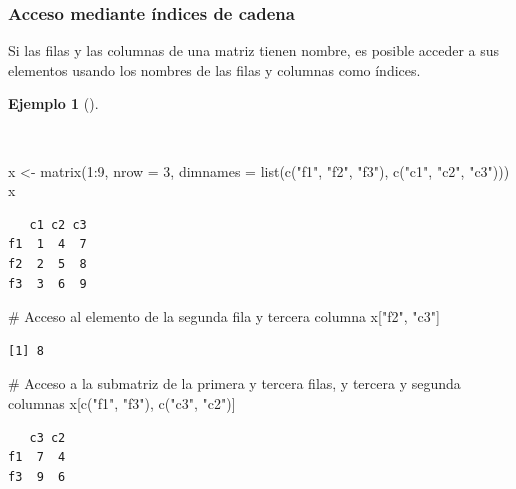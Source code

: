 \documentclass[
  a4paper,
]{scrreport}
\newenvironment{Shaded}{\begin{snugshade}}{\end{snugshade}}
\newcommand{\AttributeTok}[1]{\textcolor[rgb]{0.40,0.45,0.13}{#1}}
\newcommand{\CommentTok}[1]{\textcolor[rgb]{0.37,0.37,0.37}{#1}}
\newcommand{\DecValTok}[1]{\textcolor[rgb]{0.68,0.00,0.00}{#1}}
\newcommand{\FunctionTok}[1]{\textcolor[rgb]{0.28,0.35,0.67}{#1}}
\newcommand{\NormalTok}[1]{\textcolor[rgb]{0.00,0.23,0.31}{#1}}
\newcommand{\OtherTok}[1]{\textcolor[rgb]{0.00,0.23,0.31}{#1}}
\newcommand{\SpecialCharTok}[1]{\textcolor[rgb]{0.37,0.37,0.37}{#1}}
\newcommand{\StringTok}[1]{\textcolor[rgb]{0.13,0.47,0.30}{#1}}
\theoremstyle{definition}
\theoremstyle{definition}
\newtheorem{example}{Ejemplo}[chapter]
\theoremstyle{remark}
\begin{document}
\hypertarget{acceso-mediante-uxedndices-de-cadena}{%
\subsubsection{Acceso mediante índices de
cadena}\label{acceso-mediante-uxedndices-de-cadena}}

Si las filas y las columnas de una matriz tienen nombre, es posible
acceder a sus elementos usando los nombres de las filas y columnas como
índices.

\begin{example}[]\protect\hypertarget{exm-acceso-matriz-nombres}{}\label{exm-acceso-matriz-nombres}

~

\begin{Shaded}
\begin{Highlighting}[]
\NormalTok{x }\OtherTok{\textless{}{-}} \FunctionTok{matrix}\NormalTok{(}\DecValTok{1}\SpecialCharTok{:}\DecValTok{9}\NormalTok{, }\AttributeTok{nrow =} \DecValTok{3}\NormalTok{, }\AttributeTok{dimnames =} \FunctionTok{list}\NormalTok{(}\FunctionTok{c}\NormalTok{(}\StringTok{"f1"}\NormalTok{, }\StringTok{"f2"}\NormalTok{, }\StringTok{"f3"}\NormalTok{), }\FunctionTok{c}\NormalTok{(}\StringTok{"c1"}\NormalTok{, }\StringTok{"c2"}\NormalTok{, }\StringTok{"c3"}\NormalTok{)))}
\NormalTok{x}
\end{Highlighting}
\end{Shaded}

\begin{verbatim}
   c1 c2 c3
f1  1  4  7
f2  2  5  8
f3  3  6  9
\end{verbatim}

\begin{Shaded}
\begin{Highlighting}[]
\CommentTok{\# Acceso al elemento de la segunda fila y tercera columna}
\NormalTok{x[}\StringTok{"f2"}\NormalTok{, }\StringTok{"c3"}\NormalTok{]}
\end{Highlighting}
\end{Shaded}

\begin{verbatim}
[1] 8
\end{verbatim}

\begin{Shaded}
\begin{Highlighting}[]
\CommentTok{\# Acceso a la submatriz de la primera y tercera filas, y tercera y segunda columnas}
\NormalTok{x[}\FunctionTok{c}\NormalTok{(}\StringTok{"f1"}\NormalTok{, }\StringTok{"f3"}\NormalTok{), }\FunctionTok{c}\NormalTok{(}\StringTok{"c3"}\NormalTok{, }\StringTok{"c2"}\NormalTok{)]}
\end{Highlighting}
\end{Shaded}

\begin{verbatim}
   c3 c2
f1  7  4
f3  9  6
\end{verbatim}

\end{example}
\end{document}
